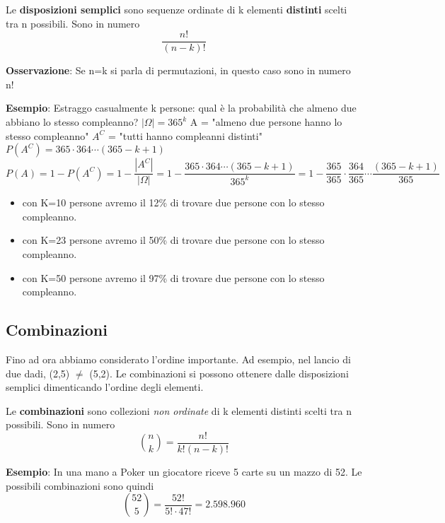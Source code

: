 Le \textbf{disposizioni semplici} sono sequenze ordinate di k elementi \textbf{distinti} scelti tra n possibili. Sono in numero $$\dfrac{n!}{(n-k)!}$$ 

\noindent \textbf{Osservazione}: Se n=k si parla di permutazioni, in questo caso sono in numero n! \newline

\begin{tcolorbox}
    \textbf{Esempio}: Estraggo casualmente k persone: qual è la probabilità che almeno due abbiano lo stesso compleanno? \newline
    $|\Omega| = 365^k$ \newline
    A = "almeno due persone hanno lo stesso compleanno" \newline
    $A^C$ = "tutti hanno compleanni distinti" \newline
    $P(A^C) = 365 \cdot 364 \cdots (365 - k + 1)$ \newline
    $P(A) = 1 - P(A^C) = 1 - \dfrac{|A^C|}{|\Omega|} = 1 - \dfrac{365 \cdot 364 \cdots (365 - k + 1) }{365^k} = 1 - \dfrac{365}{365} \cdot \dfrac{364}{365} \cdots \dfrac{(365 - k+1)}{365}$
    \begin{itemize}
        \item con K=10 persone avremo il 12\% di trovare due persone con lo stesso compleanno.
        \item con K=23 persone avremo il 50\% di trovare due persone con lo stesso compleanno.
        \item con K=50 persone avremo il 97\% di trovare due persone con lo stesso compleanno.
    \end{itemize}
\end{tcolorbox} 
    

\subsection{Combinazioni}

Fino ad ora abbiamo considerato l'ordine importante. Ad esempio, nel lancio di due dadi, (2,5) $\not=$ (5,2). Le combinazioni si possono ottenere dalle disposizioni semplici dimenticando l'ordine degli elementi.

\noindent Le \textbf{combinazioni} sono collezioni \textit{non ordinate} di k elementi distinti scelti tra n possibili. Sono in numero $$ \binom{n}{k} = \dfrac{n!}{ k!( n-k)!}$$ 

\begin{tcolorbox}
    \textbf{Esempio}: In una mano a Poker un giocatore riceve 5 carte su un mazzo di 52. Le possibili combinazioni sono quindi $$\binom{52}{5} = \dfrac{52!}{5! \cdot 47!} = 2.598.960$$
\end{tcolorbox} 

